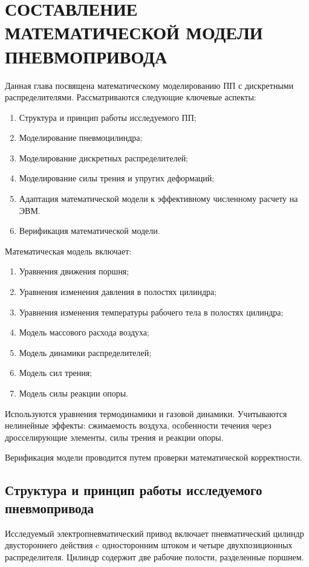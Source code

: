 \chapter{СОСТАВЛЕНИЕ МАТЕМАТИЧЕСКОЙ МОДЕЛИ ПНЕВМОПРИВОДА}\label{ch:ch2}
Данная глава посвящена математическому моделированию ПП
с дискретными распределителями. Рассматриваются следующие ключевые аспекты:

\begin{enumerate}
    \item Структура и принцип работы исследуемого ПП;
    \item Моделирование пневмоцилиндра;
    \item Моделирование дискретных распределителей;
    \item Моделирование силы трения и упругих деформаций;
    \item Адаптация математической модели к эффективному численному расчету на ЭВМ.
    \item Верификация математической модели.
\end{enumerate}

Математическая модель включает:

\begin{enumerate}
    \item Уравнения движения поршня;
    \item Уравнения изменения давления в полостях цилиндра;
    \item Уравнения изменения температуры рабочего тела в полостях цилиндра;
    \item Модель массового расхода воздуха;
    \item Модель динамики распределителей;
    \item Модель сил трения;
    \item Модель силы реакции опоры.
\end{enumerate}

Используются уравнения термодинамики и газовой динамики. Учитываются нелинейные эффекты:
сжимаемость воздуха, особенности течения через дросселирующие элементы, силы трения и реакции опоры.

Верификация модели проводится путем проверки математической корректности.



\section{Структура и принцип работы исследуемого пневмопривода}\label{sec:ch2/sec1}
Исследуемый электропневматический привод включает пневматический цилиндр двустороннего действия
c односторонним штоком и четыре двухпозиционных распределителя.
Цилиндр содержит две рабочие полости, разделенные поршнем.

